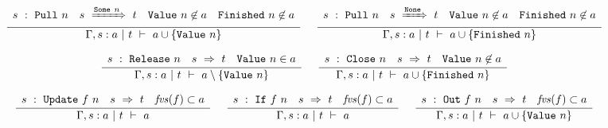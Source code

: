
\begin{figure*}

$$
\frac {\displaystyle 
    \begin{array}{lccr}
        s ~:~ \mathtt{Pull}~n    &
        s ~\xRightarrow{\mathtt{Some}~n}~ t          &
        \mathtt{Value}~n \not\in a             &
        \mathtt{Finished}~n \not\in a
    \end{array}
} {\displaystyle  
     \Gamma, s : a  ~|~  t  ~\vdash~  a \cup \{ \mathtt{Value}~n \} 
} \ 
\quad
\frac {\displaystyle 
    \begin{array}{lccr}
        s ~:~ \mathtt{Pull}~n    &
        s ~\xRightarrow{\mathtt{None}}~ t          &
        \mathtt{Value}~n \not\in a             &
        \mathtt{Finished}~n \not\in a
    \end{array}
} {\displaystyle  
     \Gamma, s : a  ~|~  t  ~\vdash~  a \cup \{ \mathtt{Finished}~n \} 
} \ 
$$

$$
\frac {\displaystyle 
    \begin{array}{lcr}
        s ~:~ \mathtt{Release}~n    &
        s ~\Rightarrow~ t          &
        \mathtt{Value}~n \in a
    \end{array}
} {\displaystyle  
     \Gamma, s : a  ~|~  t  ~\vdash~  a \setminus \{ \mathtt{Value}~n \} 
} \ 
\quad
\frac {\displaystyle 
    \begin{array}{lcr}
        s ~:~ \mathtt{Close}~n    &
        s ~\Rightarrow~ t          &
        \mathtt{Value}~n \not\in a
    \end{array}
} {\displaystyle  
     \Gamma, s : a  ~|~  t  ~\vdash~  a \cup \{ \mathtt{Finished}~n \} 
} \ 
$$

$$
\frac {\displaystyle 
    \begin{array}{lcr}
        s ~:~ \mathtt{Update}~f~n    &
        s ~\Rightarrow~ t          &
        \mathit{fvs}(f) \subset a
    \end{array}
} {\displaystyle  
     \Gamma, s : a  ~|~  t  ~\vdash~  a 
} \ 
\quad
\frac {\displaystyle 
    \begin{array}{lcr}
        s ~:~ \mathtt{If}~f~n    &
        s ~\Rightarrow~ t          &
        \mathit{fvs}(f) \subset a
    \end{array}
} {\displaystyle  
     \Gamma, s : a  ~|~  t  ~\vdash~  a 
} \ 
\quad
\frac {\displaystyle 
    \begin{array}{lcr}
        s ~:~ \mathtt{Out}~f~n    &
        s ~\Rightarrow~ t          &
        \mathit{fvs}(f) \subset a
    \end{array}
} {\displaystyle  
     \Gamma, s : a  ~|~  t  ~\vdash~  a \cup \{ \mathtt{Value}~n \} 
} \ 
$$


\end{figure*}
